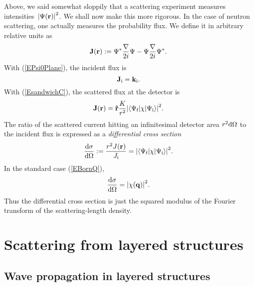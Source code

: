 Above, we said somewhat sloppily
that a scattering experiment measures intensities~${|\Psi(\mathbf{r})|}^2$.
We shall now make this more rigorous.
In the case of neutron scattering,
one actually measures the probability flux.
We define it in arbitrary relative units as
\begin{equation}
  \mathbf{J}(\mathbf{r}) := \Psi^*\frac{\mathbf{\nabla}}{2i}\Psi - \Psi\frac{\mathbf{\nabla}}{2i}\Psi^*.
\end{equation}
With (\ref{EPsi0Plane}), the incident flux is
\begin{equation}
  \mathbf{J}_\text{i} = \mathbf{k}_\text{i}.
\end{equation}
With (\ref{EsandwichC}), the scattered flux at the detector is
\begin{equation}
  \mathbf{J}(\mathbf{r})
  = \mathbf{\hat r}\frac{K}{r^2}
    {\left|\langle\Psi_\text{f}|\chi|\Psi_\text{i}\rangle\right|}^2.
\end{equation}
The ratio of the scattered current hitting an infinitesimal detector area
$r^2{\rm d}\Omega$ to the incident flux is expressed as a
\textit{differential cross section}
\begin{equation}
  \frac{{\rm d}\sigma}{{\rm d}\Omega}
  := \frac{r^2 J(\mathbf{r})}{J_\text{i}}
  =  {\left|\langle\Psi_\text{f}|\chi|\Psi_\text{i}\rangle\right|}^2.
\end{equation}
In the standard case (\ref{EBornQ}),
\begin{equation}\label{Ecross1}
  \frac{{\rm d}\sigma}{{\rm d}\Omega}
  = {\left| \chi(\mathbf{q}) \right|}^2.
\end{equation}
Thus the differential cross section is just the squared modulus
of the Fourier transform 
of the scattering-length density.


\section{Scattering from layered structures}\label{Sdwba}

\subsection{Wave propagation in layered structures}

